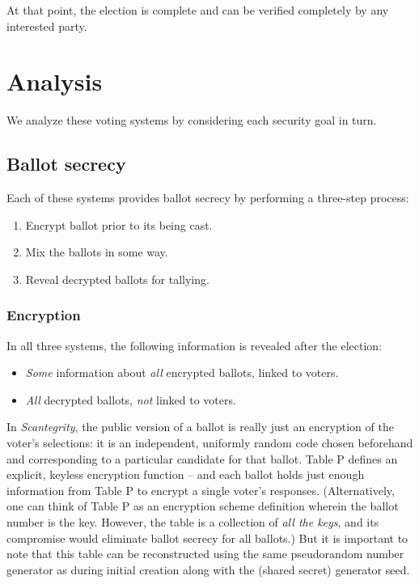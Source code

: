 \documentclass[10pt,twocolumn]{article}
\newcommand{\term}[1]{\textit{#1}}
\begin{document}
At that point, the election is complete and can be verified completely by any interested party.

\section{Analysis}

We analyze these voting systems by considering each security goal in turn.

\subsection{Ballot secrecy}

Each of these systems provides ballot secrecy by performing a three-step process:
\begin{enumerate}
	\item
		Encrypt ballot prior to its being cast.
	\item
		Mix the ballots in some way.
	\item
		Reveal decrypted ballots for tallying.
\end{enumerate}

\subsubsection{Encryption}

In all three systems, the following information is revealed after the election:
\begin{itemize}
	\item
		\emph{Some} information about \emph{all} encrypted ballots, linked to voters.
	\item
		\emph{All} decrypted ballots, \emph{not} linked to voters.
\end{itemize}

In \term{Scantegrity}, the public version of a ballot is really just an encryption of the voter's
selections: it is an independent, uniformly random code chosen beforehand and corresponding to a
particular candidate for that ballot. Table P defines an explicit, keyless encryption
function -- and each ballot holds just enough information from Table P to encrypt a single voter's
responses. (Alternatively, one can think of Table P as an encryption scheme definition wherein the
ballot number is the key. However, the table is a collection of \emph{all the keys}, and its
compromise would eliminate ballot secrecy for all ballots.) But it is important to note that this
table can be reconstructed using the same pseudorandom number generator as during initial creation
along with the (shared secret) generator seed.
\end{document}
